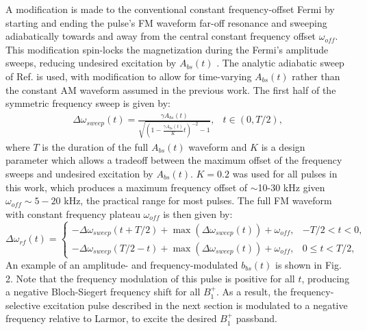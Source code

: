 \documentclass{article}
\newcommand{\bbst}{b_{bs}(t)}
\begin{document}
\par A modification is made 
to the conventional constant frequency-offset Fermi by starting and ending the pulse's FM waveform
far-off resonance and sweeping adiabatically towards and away from the central constant frequency offset $\omega_{off}$. 
This modification spin-locks the magnetization during the Fermi's amplitude sweeps, reducing undesired excitation by $A_{bs}(t)$ \cite{Garwood2001TheNMR, KhalighiAdiabaticMapping}.
The analytic adiabatic sweep of Ref. \cite{KhalighiAdiabaticMapping} is used, 
with modification to allow for time-varying $A_{bs}(t)$ rather than the constant AM waveform assumed in the previous work. The first half of the symmetric frequency sweep is given by:
\begin{equation}
    \begin{array}{ll}
    \Delta\omega_{sweep}(t) = \frac{\gamma A_{bs}(t)}{\sqrt{\left(1-\frac{\gamma A_{bs}(t)}{K}t\right)^{-2}-1}}, & t \in \left(0, T/2\right), \end{array}
\end{equation}
where $T$ is the duration of the full $A_{bs}(t)$ waveform and $K$ is a design parameter which allows a tradeoff between the maximum offset of the frequency sweeps and undesired excitation by $A_{bs}(t)$.
$K = 0.2$ was used for all pulses in this work, 
which produces a maximum frequency offset of $\sim$10-30 kHz given $\omega_{off}\sim5-20$ kHz, the practical range for most pulses. 
The full FM waveform with constant frequency plateau $\omega_{off}$ is then given by:
\begin{equation}
	\Delta\omega_{rf}(t) = \left\{ \begin{array}{rl} 	-\Delta\omega_{sweep}(t+T/2)+\max(\Delta\omega_{sweep}(t))+\omega_{off}, & -T/2<t<0, \\ 
	-\Delta\omega_{sweep}(T/2 - t)+\max(\Delta\omega_{sweep}(t))+\omega_{off}, & 0 \leq t<T/2, \end{array} \right.
\end{equation}
An example of an amplitude- and frequency-modulated $\bbst$ is shown in Fig. 2.
Note that the frequency modulation of this pulse is positive for all $t$, 
producing a negative Bloch-Siegert frequency shift for all $B_1^+$. 
As a result, the frequency-selective excitation pulse described in the next section is 
modulated to a negative frequency relative to Larmor, 
to excite the desired $B_1^+$ passband.
\end{document}
